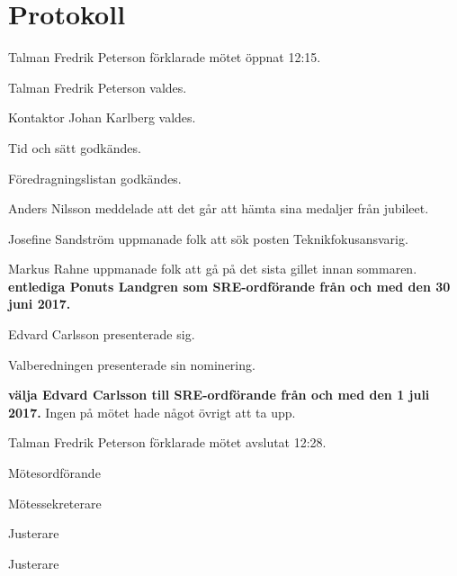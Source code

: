 \documentclass[10pt]{article}
\def\mo{Fredrik Peterson}
\def\ms{Johan Karlberg}
\def\ji{Anders Nilsson}
\def\jii{Christian Benson}
\begin{document}
\newpage
\section*{Protokoll}
\begin{paragrafer}
Talman {\mo} förklarade mötet öppnat 12:15.

Talman {\mo} valdes.

Kontaktor {\ms} valdes.

Tid och sätt godkändes.

\valavj

\ingaadj

Föredragningslistan godkändes.


Anders Nilsson meddelade att det går att hämta sina medaljer från jubileet.

Josefine Sandström uppmanade folk att sök posten Teknikfokusansvarig.

Markus Rahne uppmanade folk att gå på det sista gillet innan sommaren.
\textbf{\Mba entlediga Ponuts Landgren som SRE-ordförande från och med den 30 juni 2017.}

Edvard Carlsson presenterade sig.

Valberedningen presenterade sin nominering.

\textbf{\Mba välja Edvard Carlsson till SRE-ordförande från och med den 1 juli 2017.}
Ingen på mötet hade något övrigt att ta upp.

Talman {\mo} förklarade mötet avslutat 12:28.
\newpage
\hidesignfoot
\end{paragrafer}
\begin{signatures}{4}
\signature{\mo}{Mötesordförande}
\signature{\ms}{Mötessekreterare}
\signature{\ji}{Justerare}
\signature{\jii}{Justerare}
\end{signatures}
\end{document}
